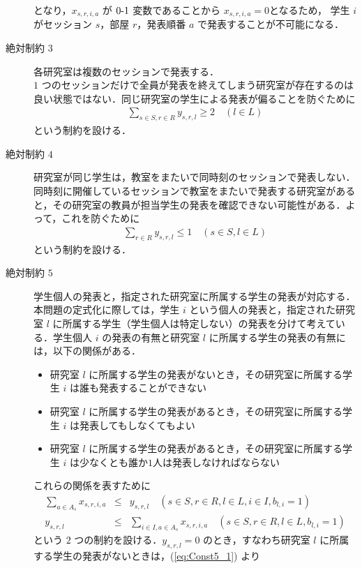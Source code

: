 \documentclass[a4paper,12pt,fleqn]{jarticle}
\begin{document}
\begin{description}
  となり，$x_{s,r,i,a}$ が $0\mathchar`-1$ 変数であることから $x_{s,r,i,a} = 0$となるため， 学生 $i$ がセッション $s$，部屋 $r$，発表順番 $a$ で発表することが不可能になる．
\item[絶対制約 $3$] 各研究室は複数のセッションで発表する．\\$1$ つのセッションだけで全員が発表を終えてしまう研究室が存在するのは良い状態ではない．同じ研究室の学生による発表が偏ることを防ぐために
  \begin{eqnarray}
    \sum_{s \in S, r \in R} y_{s,r,l} \geq 2 \quad (l \in L)
  \end{eqnarray}
  という制約を設ける．
\item[絶対制約 $4$] 研究室が同じ学生は，教室をまたいで同時刻のセッションで発表しない．\\同時刻に開催しているセッションで教室をまたいで発表する研究室があると，その研究室の教員が担当学生の発表を確認できない可能性がある．よって，これを防ぐために
  \begin{eqnarray}
    \sum_{r \in R} y_{s,r,l} \leq 1 \quad (s \in S, l \in L)
  \end{eqnarray}
  という制約を設ける．
\item[絶対制約 $5$] 学生個人の発表と，指定された研究室に所属する学生の発表が対応する．\\本問題の定式化に際しては，学生 $i$ という個人の発表と，指定された研究室 $l$ に所属する学生（学生個人は特定しない）の発表を分けて考えている．学生個人 $i$ の発表の有無と研究室 $l$ に所属する学生の発表の有無には，以下の関係がある．
  \begin{itemize}
  \item 研究室 $l$ に所属する学生の発表がないとき，その研究室に所属する学生 $i$ は誰も発表することができない
  \item 研究室 $l$ に所属する学生の発表があるとき，その研究室に所属する学生 $i$ は発表してもしなくてもよい
  \item 研究室 $l$ に所属する学生の発表があるとき，その研究室に所属する学生 $i$ は少なくとも誰か$1$人は発表しなければならない
  \end{itemize}
  これらの関係を表すために
  \begin{eqnarray}
   \sum_{a \in A_s} x_{s,r,i,a} & \leq & y_{s,r,l} \quad (s \in S, r \in R, l \in L, i \in I, b_{l,i} = 1) \label{eq:Const5_1} \\
    y_{s,r,l} & \leq & \sum_{i \in I, a \in A_s} x_{s,r,i,a} \quad (s \in S, r \in R, l \in L, b_{l,i} = 1) \label{eq:Const5_2}
  \end{eqnarray}
  という $2$ つの制約を設ける．$y_{s,r,l}=0$ のとき，すなわち研究室 $l$ に所属する学生の発表がないときは，(\ref{eq:Const5_1}) より

\end{description}
\end{document}
